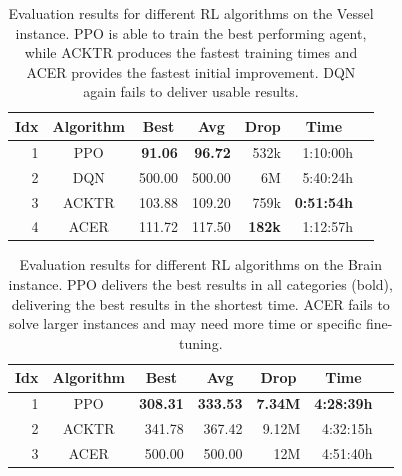 \begin{table}[htp]
    \begin{center}
        \begin{tabular}{rcrrrrr}
            \toprule
            \multicolumn{1}{c}{Idx} & \multicolumn{1}{c}{Algorithm} & \multicolumn{1}{c}{Best} & \multicolumn{1}{c}{Avg} & \multicolumn{1}{c}{Drop} & \multicolumn{1}{c}{Time}\\
            \midrule
            1 & PPO & \textbf{91.06} & \textbf{96.72} & 532k & 1:10:00h \\
            2 & DQN & 500.00 & 500.00 & 6M & 5:40:24h \\
            3 & ACKTR & 103.88 & 109.20 & 759k & \textbf{0:51:54h} \\
            4 & ACER & 111.72 & 117.50 & \textbf{182k} & 1:12:57h \\
            \bottomrule
        \end{tabular}
    \end{center}
    \caption[Evaluation of RL Algorithms on the Vessel Instance]{Evaluation results for different RL algorithms on the Vessel instance. PPO is able to train the best performing agent, while ACKTR produces the fastest training times and ACER provides the fastest initial improvement. DQN again fails to deliver usable results.} \label{tab:AlgorithmEval/VesselMaze02}
\end{table}

\begin{table}[htp]
    \begin{center}
        \begin{tabular}{rcrrrrr}
            \toprule
            \multicolumn{1}{c}{Idx} & \multicolumn{1}{c}{Algorithm} & \multicolumn{1}{c}{Best} & \multicolumn{1}{c}{Avg} & \multicolumn{1}{c}{Drop} &  \multicolumn{1}{c}{Time}\\
            \midrule
            1 & PPO & \textbf{308.31} & \textbf{333.53} & \textbf{7.34M} & \textbf{4:28:39h} \\
            2 & ACKTR & 341.78 & 367.42 & 9.12M & 4:32:15h \\
            3 & ACER & 500.00 & 500.00 & 12M & 4:51:40h \\
            \bottomrule
        \end{tabular}
    \end{center}
    \caption{Evaluation results for different RL algorithms on the Brain instance. PPO delivers the best results in all categories (bold), delivering the best results in the shortest time. ACER fails to solve larger instances and may need more time or specific fine-tuning.} \label{tab:AlgorithmEval/Maze0122}
\end{table}

